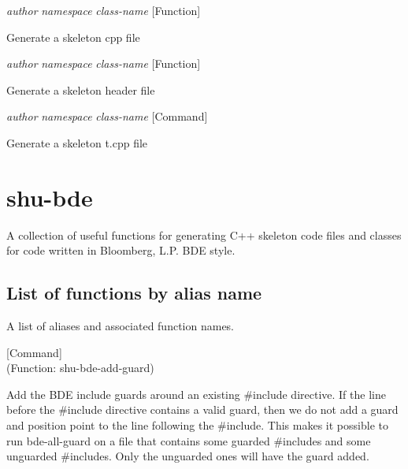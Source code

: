 \vspace{1em}
\noindent
{}
\usebox{\funcname}\emph{author} \emph{namespace} \emph{class-name}
 \hfill [Function]

\begin{doc-string}
Generate a skeleton cpp file
\end{doc-string}

\vspace{1em}
\noindent
{}
\usebox{\funcname}\emph{author} \emph{namespace} \emph{class-name}
 \hfill [Function]

\begin{doc-string}
Generate a skeleton header file
\end{doc-string}

\vspace{1em}
\noindent
{}
\usebox{\funcname}\emph{author} \emph{namespace} \emph{class-name}
 \hfill [Command]

\begin{doc-string}
Generate a skeleton t.cpp file
\end{doc-string}

\eject
\section{shu-bde}


A collection of useful functions for generating C++ skeleton code files
and classes for code written in Bloomberg, L.P. BDE style.


\subsection{List of functions by alias name}

A list of aliases and associated function names.



\vspace{1em}
\noindent
{}
\usebox{\funcname}
 \hfill [Command]\\%
 (Function: shu-bde-add-guard)

\begin{doc-string}
Add the BDE include guards around an existing \#include directive.  If the line
before the \#include directive contains a valid guard, then we do not add a guard
and position point to the line following the \#include.  This makes it possible to
run bde-all-guard on a file that contains some guarded \#includes and some unguarded
\#includes.  Only the unguarded ones will have the guard added.
\end{doc-string}

